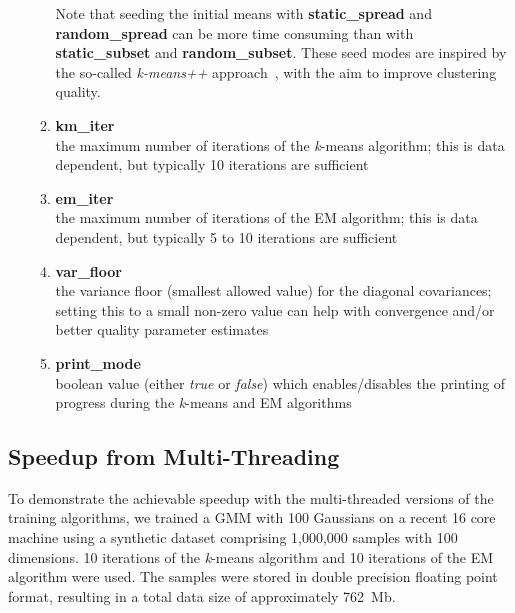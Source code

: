 \begin{small}
\begin{itemize}
\begin{enumerate}[{$\cdot$}]
Note that seeding the initial means with {\bf static\_spread} and {\bf random\_spread}
can be more time consuming than with {\bf static\_subset} and {\bf random\_subset}.
These seed modes are inspired by the so-called {\it k-means++} approach~\cite{Arthur_2007}, with the aim to improve clustering quality.

\item
{\bf km\_iter}\\
the maximum number of iterations of the {\it k}-means algorithm; this is data dependent, but typically 10 iterations are sufficient

\item
{\bf em\_iter}\\
the maximum number of iterations of the EM algorithm; this is data dependent, but typically 5 to 10 iterations are sufficient

\item
{\bf var\_floor}\\
the variance floor (smallest allowed value) for the diagonal covariances; setting this to a small non-zero value can help with convergence and/or better quality parameter estimates

\item
{\bf print\_mode}\\
boolean value (either {\it true} or {\it false}) which enables/disables the printing of progress during the {\it k}-means and EM algorithms 

\end{enumerate}


\end{itemize}
\end{small}


\newpage

\subsection{Speedup from Multi-Threading}
\label{sec:speedup}

To demonstrate the achievable speedup with the multi-threaded versions of the training algorithms,
we trained a GMM with 100 Gaussians on a recent 16 core machine using a synthetic dataset comprising 1,000,000 samples with 100 dimensions.
10 iterations of the {\it k}-means algorithm and 10 iterations of the EM algorithm were used.
The samples were stored in double precision floating point format, resulting in a total data size of approximately 762~Mb.

